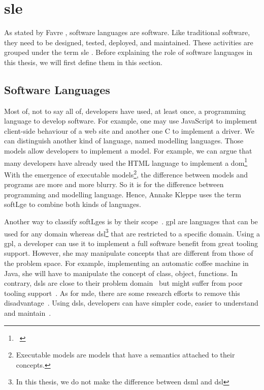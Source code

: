 \section[Software Language Engineering]{\glsdesc{sle}}
\label{sec:back:sle}

As stated by Favre \etal \cite{DBLP:conf/sle/FavreGLP10}, software languages are software.
Like traditional software, they need to be designed, tested, deployed, and maintained.
These activities are grouped under the term \gls{sle} \cite{kleppe2008software}.
Before explaining the role of software languages in this thesis, we will first define them in this section.

\subsection{Software Languages}

Most of, not to say all of, developers have used, at least once, a programming language to develop software.
For example, one may use JavaScript to implement client-side behaviour of a web site and another one C to implement a driver.
We can distinguish another kind of language, named modelling languages.
Those models allow developers to implement a model.
For example, we can argue that many developers have already used the HTML language to implement a \gls{dom}\footnote{~\cite{DOM:Spec}}
With the emergence of executable models\footnote{Executable models are models that have a semantics attached to their concepts.}, the difference between models and programs are more and more blurry.
So it is for the difference between programming and modelling language.
Hence, Annake Kleppe uses the term \gls{softLge} to combine both kinds of languages.

Another way to classify \glspl{softLge} is by their scope~\cite{DBLP:journals/sigplan/DeursenKV00}.
\Gls{gpl} are languages that can be used for any domain whereas \gls{dsl}\footnote{In this thesis, we do not make the difference between \gls{dsml} and \gls{dsl}} that are restricted to a specific domain.
Using a \gls{gpl}, a developer can use it to implement a full software benefit from great tooling support. 
However, she may manipulate concepts that are different from those of the problem space.
For example, implementing an automatic coffee machine in Java, she will have to manipulate the concept of class, object, functions.
In contrary, \glspl{dsl} are close to their problem domain~\cite{DBLP:journals/smr/DeursenK98} but might suffer from poor tooling support~\cite{voelter2014generic}.
As for \gls{mde}, there are some research efforts to remove this disadvantage~\cite{DBLP:journals/jss/BousseLCWB18}. 
Using \glspl{dsl}, developers can have simpler code, easier to understand and maintain~\cite{DBLP:journals/sigplan/DeursenKV00, DBLP:journals/smr/DeursenK98}.

